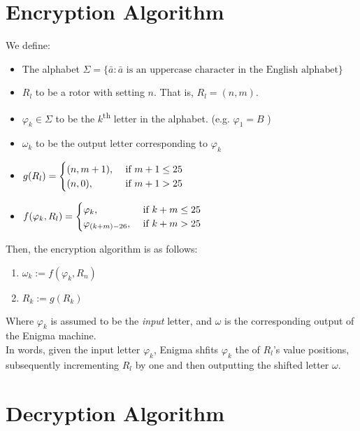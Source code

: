 \documentclass[12pt,a4paper]{article}
\begin{document}
	\section{Encryption Algorithm}
	We define:
		\begin{itemize}
			\item The alphabet $\Sigma = \{\bar{a}: \bar{a} \text{ is an uppercase character in the English alphabet} \}$
			\item $R_l$ to be a rotor with setting $n$. That is, $R_l = (n, m)$.
			\item $\varphi_k \in \Sigma$ to be the $k$\textsuperscript{th} letter in the alphabet. (e.g. $\varphi_1 = B$ )
			\item $\omega_k$ to be the output letter corresponding to $\varphi_k$

			\item 
				$g(R_l) = \begin{cases}
					 (n, m+1), & \text{ if }  m+1 \leq 25 \cr
				        (n, 0), & \text{ if } {m+1} > 25 \cr 
				  \end{cases} 
				$
				
			\item 
					$f(\varphi_k, R_l) =	\begin{cases} 
						\varphi_{k}, & \text{ if } {k+m} \leq 25 \cr
						\varphi_{(k+m)-26}, & \text{ if }{k+m} > 25 \cr
					\end{cases}
					$ 
		\end{itemize}
	

	Then, the encryption algorithm is as follows:
	
	\begin{enumerate}
		\item $\omega_k := f(\varphi_k, R_n)$
		\item $R_k := g(R_k)$
	\end{enumerate}

	Where $\varphi_k$ is assumed to be the \emph{input} letter, and $\omega$ is the corresponding output of the Enigma machine. \\
	
	In words, given the input letter $\varphi_k$, Enigma shfits $\varphi_k$ the of $R_l$'s value positions, subsequently incrementing $R_l$ by one and then outputting the shifted letter $\omega$.

	\section{Decryption Algorithm}
\end{document}
